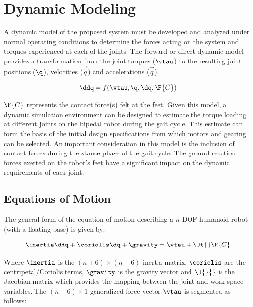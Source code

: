 
\section{Dynamic Modeling} %
\label{sec:designspec}

A dynamic model of the proposed system must be developed and analyzed under normal operating conditions to determine the forces acting on the system and torques experienced at each of the joints. The forward or direct dynamic model provides a transformation from the joint torques ($\vtau$) to the resulting joint positions ($\q$), velocities ($\vec{\dot{q}}$) and accelerations ($\vec{\ddot{q}}$).

\begin{equation}
	\ddq = f(\vtau, \q, \dq, \F{C})
\end{equation}

$\F{C}$ represents the contact force(s) felt at the feet. Given this model, a dynamic simulation environment can be designed to estimate the torque loading at different joints on the bipedal robot during the gait cycle. This estimate can form the basis of the initial design specifications from which motors and gearing can be selected. An important consideration in this model is the inclusion of contact forces during the stance phase of the gait cycle. The ground reaction forces exerted on the robot's feet have a significant impact on the dynamic requirements of each joint.

\subsection{Equations of Motion} %
\label{sec:forward_dynamics}

The general form of the equation of motion describing a $n$-DOF humanoid robot (with a floating base) is given by: 

\begin{equation}
	\label{eq:eom1}
	\inertia \ddq + \coriolis \dq + \gravity = \vtau + \Jt{} \F{C}
\end{equation}

Where $\inertia$ is the $(n+6) \times (n+6)$ inertia matrix, $\coriolis$ are the centripetal/Coriolis terms, $\gravity$ is the gravity vector and $\J{}{}$ is the Jacobian matrix which provides the mapping between the joint and work space variables. The $(n+6) \times 1$ generalized force vector $\vtau$ is segmented as follows:

